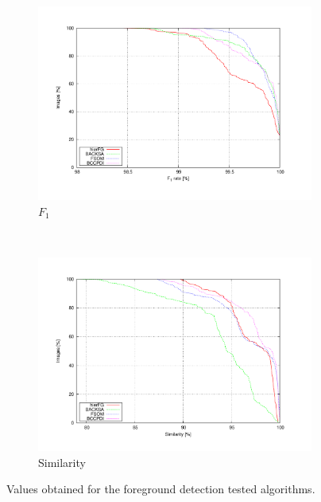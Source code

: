 \begin{figure}[t]
        \begin{subfigure}[b]{0.5\textwidth}
                \centering
                \includegraphics[width=\textwidth, trim=50 40 80 50,clip]{fig11.pdf}
                \caption{$F_1$}
                \label{fig:cp02_f1Chart}
        \end{subfigure}%
        ~ %
        \begin{subfigure}[b]{0.5\textwidth}
                \centering
                \includegraphics[width=\textwidth, trim=50 40 80 50,clip]{fig12.pdf}
                \caption{Similarity}
                \label{fig:cp02_similarityChart}
        \end{subfigure}
        \caption{Values obtained for the foreground detection tested algorithms.}\label{fig:cp02_chartsFG}
\end{figure}

